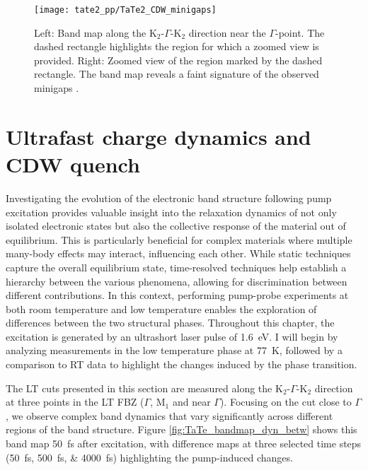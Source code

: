 \begin{figure}[t]
	\centering
	\texttt{[image: tate2\_pp/TaTe2\_CDW\_minigaps]}
	\caption{Left: Band map along the K$_2$-$\Gamma$-K$_2$ direction near the $\Gamma$-point. The dashed rectangle highlights the region for which a zoomed view is provided. Right: Zoomed view of the region marked by the dashed rectangle. The band map reveals a faint signature of the observed minigaps \cite{lin_evidence_2022}.}
	\label{fig:TaTe_minigaps}
\end{figure}

\section{Ultrafast charge dynamics and CDW quench}
\label{sec:tate_dynamics}

Investigating the evolution of the electronic band structure following pump excitation provides valuable insight into the relaxation dynamics of not only isolated electronic states but also the collective response of the material out of equilibrium.
This is particularly beneficial for complex materials where multiple many-body effects may interact, influencing each other.
While static techniques capture the overall equilibrium state, time-resolved techniques help establish a hierarchy between the various phenomena, allowing for discrimination between different contributions.
In this context, performing pump-probe experiments at both room temperature and low temperature enables the exploration of differences between the two structural phases.
Throughout this chapter, the excitation is generated by an ultrashort laser pulse of \qty{1.6}{\electronvolt}.
I will begin by analyzing measurements in the low temperature phase at \qty{77}{\kelvin}, followed by a comparison to RT data to highlight the changes induced by the phase transition.

The LT cuts presented in this section are measured along the K$_2$-$\Gamma$-K$_2$ direction at three points in the LT FBZ ($\Gamma$, M$_1$ and near $\Gamma$).
Focusing on the cut close to $\Gamma$, we observe complex band dynamics that vary significantly across different regions of the band structure.
Figure \ref{fig:TaTe_bandmap_dyn_betw} shows this band map \qty{50}{\femto\second} after excitation, with difference maps at three selected time steps (\qtylist{50; 500; 4000}{\femto\second}) highlighting the pump-induced changes.

